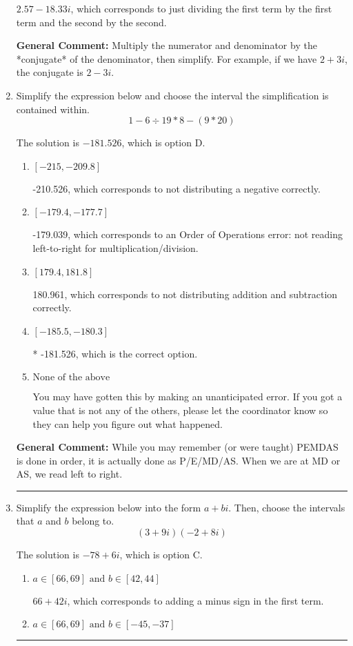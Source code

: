 \documentclass{extbook}[14pt]
\newcommand{\litem}[1]{\item #1

\rule{\textwidth}{0.4pt}}
\begin{document}
\begin{enumerate}
{\begin{enumerate}[label=\Alph*.]
 $2.57  - 18.33 i$, which corresponds to just dividing the first term by the first term and the second by the second.
\end{enumerate}

\textbf{General Comment:} Multiply the numerator and denominator by the *conjugate* of the denominator, then simplify. For example, if we have $2+3i$, the conjugate is $2-3i$.
}
\litem{
Simplify the expression below and choose the interval the simplification is contained within.
\[ 1 - 6 \div 19 * 8 - (9 * 20) \]

The solution is \( -181.526 \), which is option D.\begin{enumerate}[label=\Alph*.]
\item \( [-215, -209.8] \)

 -210.526, which corresponds to not distributing a negative correctly.
\item \( [-179.4, -177.7] \)

 -179.039, which corresponds to an Order of Operations error: not reading left-to-right for multiplication/division.
\item \( [179.4, 181.8] \)

 180.961, which corresponds to not distributing addition and subtraction correctly.
\item \( [-185.5, -180.3] \)

* -181.526, which is the correct option.
\item \( \text{None of the above} \)

 You may have gotten this by making an unanticipated error. If you got a value that is not any of the others, please let the coordinator know so they can help you figure out what happened.
\end{enumerate}

\textbf{General Comment:} While you may remember (or were taught) PEMDAS is done in order, it is actually done as P/E/MD/AS. When we are at MD or AS, we read left to right.
}
\litem{
Simplify the expression below into the form $a+bi$. Then, choose the intervals that $a$ and $b$ belong to.
\[ (3 + 9 i)(-2 + 8 i) \]

The solution is \( -78 + 6 i \), which is option C.\begin{enumerate}[label=\Alph*.]
\item \( a \in [66, 69] \text{ and } b \in [42, 44] \)

 $66 + 42 i$, which corresponds to adding a minus sign in the first term.
\item \( a \in [66, 69] \text{ and } b \in [-45, -37] \)


\end{enumerate}}
\end{enumerate}
\end{document}
